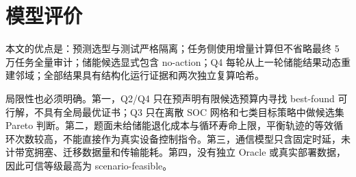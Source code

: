 \section{模型评价}
本文的优点是：预测选型与测试严格隔离；任务侧使用增量计算但不省略最终 5 万任务全量审计；储能候选显式包含 no-action；Q4 每轮从上一轮储能结果动态重建邻域；全部结果具有结构化运行证据和两次独立复算哈希。

局限性也必须明确。第一，Q2/Q4 只在预声明有限候选预算内寻找 best-found 可行解，不具有全局最优证书；Q3 只在离散 SOC 网格和七类目标策略中做候选集 Pareto 判断。第二，题面未给储能退化成本与循环寿命上限，平衡轨迹的等效循环次数较高，不能直接作为真实设备控制指令。第三，通信模型只含固定时延，未计带宽拥塞、迁移数据量和传输能耗。第四，没有独立 Oracle 或真实部署数据，因此可信等级最高为 scenario-feasible。

